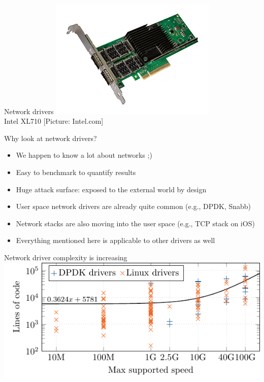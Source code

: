 \documentclass[NET,english,aspectratio=169,notitleframe]{tumbeamer}
\begin{document}
\begin{frame}{Network drivers}
\centering\includegraphics[width=0.60\textwidth]{pics/nic3}\\
\vspace{-1em}\tiny{Intel XL710 [Picture: Intel.com]}
\end{frame}

\begin{frame}{Why look at network drivers?}
\begin{itemize}
\item We happen to know a lot about networks ;)
\item Easy to benchmark to quantify results
\item Huge attack surface: exposed to the external world by design
\item User space network drivers are already quite common (e.g., DPDK, Snabb)
\item Network stacks are also moving into the user space (e.g., TCP stack on iOS)
\pause
\item Everything mentioned here is applicable to other drivers as well
\end{itemize}
\end{frame}


\begin{frame}{Network driver complexity is increasing}
\centering\includegraphics[scale=1.1]{figures/drivers-loc-scatterplot}
\end{frame}
\end{document}
